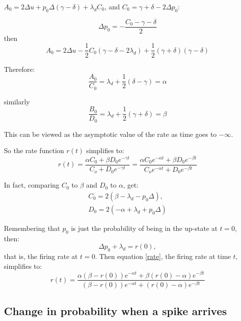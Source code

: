$A_0 = 2\Delta u + p_0\Delta(\gamma-\delta) + \lambda_d C_0$, and $C_0 = \gamma + \delta -2\Delta p_0$:

\begin{equation}
\Delta p_0 = -\frac{C_0 - \gamma - \delta}{2}
\end{equation}
then
\begin{equation}
A_0 = 2\Delta u - \frac{1}{2}C_0(\gamma-\delta - 2\lambda_d) +\frac{1}{2}(\gamma+\delta)(\gamma-\delta)
\end{equation}

Therefore:
\begin{equation}
\frac{A_0}{C_0} = \lambda_d + \frac{1}{2}(\delta-\gamma) = \alpha
\end{equation}

similarly
\begin{equation}
\frac{B_0}{D_0} = \lambda_d + \frac{1}{2}(\gamma+\delta) = \beta
\end{equation}

This can be viewed as the asymptotic value of the rate as time goes to $-\infty$.

So the rate function $r(t)$ simplifies to:
\begin{equation}\label{rate}
r(t) = \frac{\alpha C_0 + \beta D_0e^{-\gamma t}}{C_o + D_0e^{-\gamma t}} = \frac{\alpha C_0e^{-\alpha t} + \beta D_0e^{-\beta t}}{C_oe^{-\alpha t} + D_0e^{-\beta t}} 
\end{equation}

In fact, comparing $C_0$ to $\beta$ and $D_0$ to $\alpha$, get:
\begin{equation}
\begin{split}
C_0 = 2(\beta - \lambda_d - p_0\Delta), \\ 
D_0 = 2(-\alpha + \lambda_d + p_0\Delta)
\end{split}
\end{equation}

Remembering that $p_0$ is just the probability of being in the up-state at $t=0$, then:
\begin{equation}
\Delta p_0 + \lambda_d = r(0),
\end{equation}
that is, the firing rate at $t=0$.  Then equation \ref{rate}, the firing rate at time $t$, simplifies to:
\begin{equation}
r(t) = \frac{\alpha(\beta - r(0))e^{-\alpha t} + \beta(r(0)-\alpha)e^{-\beta t}}{(\beta - r(0))e^{-\alpha t} + (r(0)-\alpha)e^{-\beta t}}
\end{equation}

\subsection{Change in probability when a spike arrives}

